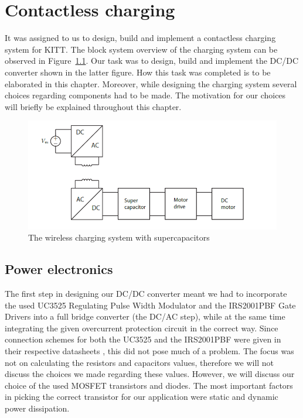 \documentclass[11pt,titlepage]{report}
\begin{document}
\chapter{Contactless charging}
\label{ch:charging}
It was assigned to us to design, build and implement a contactless charging system for KITT. The block system overview of the charging system can be observed in Figure~\ref{fig:contactless_charging}. Our task was to design, build and implement the DC/DC converter shown in the latter figure. How this task was completed is to be elaborated in this chapter. Moreover, while designing the charging system several choices regarding components had to be made. The motivation for our choices will briefly be explained throughout this chapter. \\	

\begin{figure}[H]
	\begin{center}
		\includegraphics[width=0.8\linewidth]{resource/contactless_charging.png}
	\end{center}
	\caption{The wireless charging system with supercapacitors}
	\label{fig:contactless_charging}
\end{figure}




\section{Power electronics}
The first step in designing our DC/DC converter meant we had to incorporate the used UC3525 Regulating
Pulse Width Modulator and the IRS2001PBF Gate Drivers into a full bridge converter (the
DC/AC step), while at the same time integrating the given overcurrent protection circuit in the correct
way. Since connection schemes for both the UC3525 and the IRS2001PBF were given in their respective
datasheets \cite{uc3525a-datasheet}, \cite{irs2001pbf-datasheet} this did not pose much of a problem. The focus
was not on calculating the resistors and capacitors values, therefore we will not discuss the choices we
made regarding these values. However, we will discuss our choice of the used MOSFET transistors and
diodes. The most important factors in picking the correct transistor for our application were static and
dynamic power dissipation. \\
\end{document}
